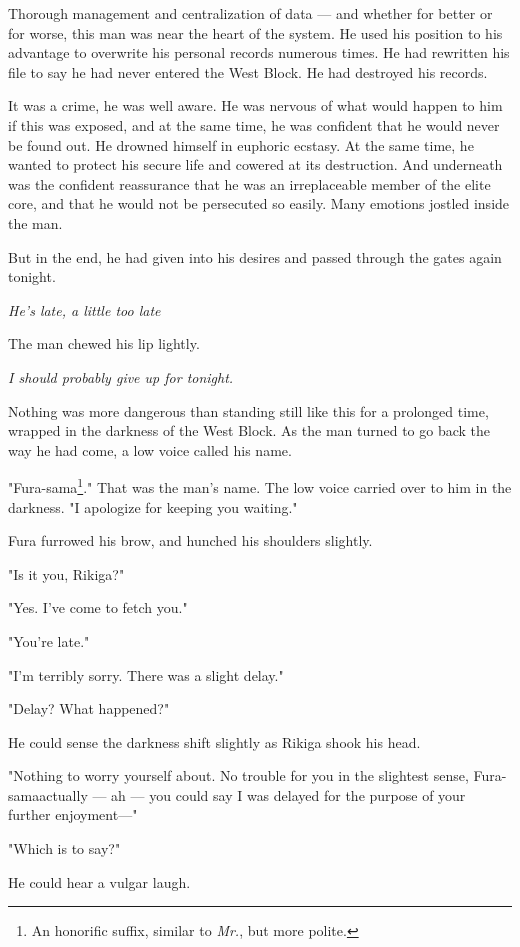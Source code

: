 Thorough management and centralization of data --- and whether for better
or for worse, this man was near the heart of the system. He used his
position to his advantage to overwrite his personal records numerous
times. He had rewritten his file to say he had never entered the West
Block. He had destroyed his records.

It was a crime, he was well aware. He was nervous of what would happen
to him if this was exposed, and at the same time, he was confident that
he would never be found out. He drowned himself in euphoric ecstasy. At
the same time, he wanted to protect his secure life and cowered at its
destruction. And underneath was the confident reassurance that he was an
irreplaceable member of the elite core, and that he would not be
persecuted so easily. Many emotions jostled inside the man.

But in the end, he had given into his desires and passed through the
gates again tonight.

\emph{He's late, a little too late\el }

The man chewed his lip lightly.

\emph{I should probably give up for tonight.}

Nothing was more dangerous than standing still like this for a prolonged
time, wrapped in the darkness of the West Block. As the man turned to go
back the way he had come, a low voice called his name.

"Fura-sama\footnote{An honorific suffix, similar to \emph{Mr.}, but more polite.}." That was the man's name. The low voice carried over to him
in the darkness. "I apologize for keeping you waiting."

Fura furrowed his brow, and hunched his shoulders slightly.

"Is it you, Rikiga?"

"Yes. I've come to fetch you."

"You're late."

"I'm terribly sorry. There was a slight delay."

"Delay? What happened?"

He could sense the darkness shift slightly as Rikiga shook his head.

"Nothing to worry yourself about. No trouble for you in the slightest
sense, Fura-sama\el actually --- ah --- you could say I was delayed for the
purpose of your further enjoyment---"

"Which is to say?"

He could hear a vulgar laugh.

